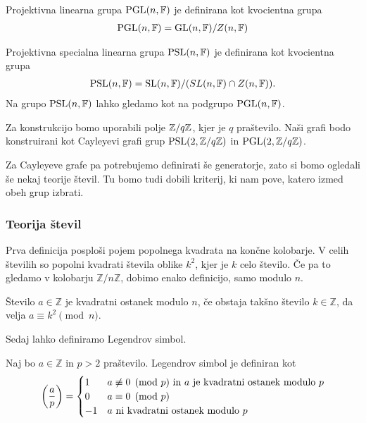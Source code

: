 \begin{definicija}
    Projektivna linearna grupa \(\operatorname{PGL}(n, \mathbb F)\) je definirana kot kvocientna grupa 
    \begin{align*}
        \operatorname{PGL}(n, \mathbb F) = \operatorname{GL}(n, \mathbb F)/Z(n, \mathbb F)
    \end{align*}

    Projektivna specialna linearna grupa \(\operatorname{PSL}(n, \mathbb F)\) je definirana kot kvocientna grupa 
    \begin{align*}
        \operatorname{PSL}(n, \mathbb F) = \operatorname{SL}(n, \mathbb F)/(SL(n, \mathbb F)\cap Z(n, \mathbb F)).
    \end{align*}
    Na grupo \(\operatorname{PSL}(n, \mathbb F)\) lahko gledamo kot na podgrupo \(\operatorname{PGL}(n, \mathbb F)\).
\end{definicija}

Za konstrukcijo bomo uporabili polje \(\mathbb Z/q\mathbb Z\), kjer je \(q\) praštevilo. Naši grafi bodo konstruirani kot Cayleyevi grafi grup \(\operatorname{PSL}(2, \mathbb Z/q\mathbb Z)\) in \(\operatorname{PGL}(2, \mathbb Z/q\mathbb Z)\).

Za Cayleyeve grafe pa potrebujemo definirati še generatorje, zato si bomo ogledali še nekaj teorije števil. Tu bomo tudi dobili kriterij, ki nam pove, katero izmed obeh grup izbrati.

\subsubsection{Teorija števil}
Prva definicija posploši pojem popolnega kvadrata na končne kolobarje. V celih številih so popolni kvadrati števila oblike \(k^2\), kjer je \(k\) celo število. Če pa to gledamo v kolobarju \(\mathbb Z/n\mathbb Z\), dobimo enako definicijo, samo modulo \(n\).
\begin{definicija}
    Število \(a\in \mathbb Z\) je kvadratni ostanek modulo \(n\), če obstaja takšno število \(k\in \mathbb Z\), da velja \(a\equiv k^2 \pmod n\).
\end{definicija}

Sedaj lahko definiramo Legendrov simbol.
\begin{definicija}
    Naj bo \(a\in \mathbb Z\) in \(p>2\) praštevilo. Legendrov simbol je definiran kot
    \begin{align*}
        \left(\frac{a}{p}\right) =
        \begin{cases}
            1  & a \not\equiv 0\pmod p \text{ in } a \text{ je kvadratni ostanek modulo } p \\
            0  & a \equiv 0 \pmod p                                            \\
            -1 & a \text{ ni kvadratni ostanek modulo } p
        \end{cases}
    \end{align*}
\end{definicija}

